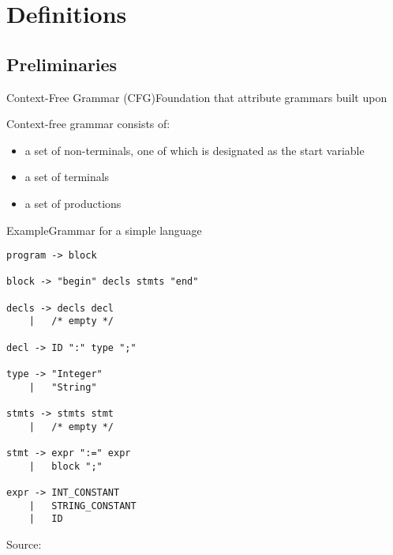 
\section{Definitions}

\subsection*{Preliminaries}

\begin{frame}{Context-Free Grammar (CFG)}{Foundation that attribute grammars built upon}

Context-free grammar consists of:
\begin{itemize}
    \item a set of non-terminals, one of which is designated as the start variable
    \item a set of terminals
    \item a set of productions
\end{itemize}
\end{frame}


\begin{frame}[fragile=singleslide]{Example}{Grammar for a simple language}

\begin{multicols}{2}
\begin{Verbatim}[fontsize=\scriptsize]
program -> block

block -> "begin" decls stmts "end"

decls -> decls decl
    |   /* empty */

decl -> ID ":" type ";"

type -> "Integer"
    |   "String"

stmts -> stmts stmt
    |   /* empty */

stmt -> expr ":=" expr
    |   block ";"

expr -> INT_CONSTANT
    |   STRING_CONSTANT
    |   ID
\end{Verbatim}
\end{multicols}


Source: \cite{Boyland1998AnalyzingDN}

\end{frame}

